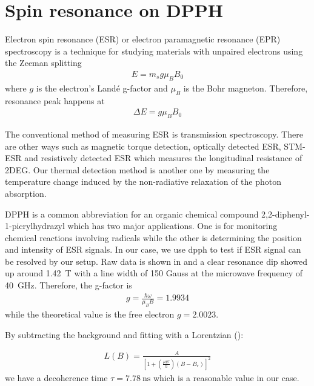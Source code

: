 \documentclass[12pt]{ruthesis}
\begin{document}
\section{Spin resonance on DPPH}\label{DPPH}

Electron spin resonance (ESR) or electron paramagnetic resonance (EPR) spectroscopy is a technique for studying materials with unpaired electrons using the Zeeman splitting 
\begin{align}
E=m_{s} g \mu_{B} B_{0}
\end{align}
where $g$ is the electron's Land\'{e} g-factor and $\mu_{B}$ is the Bohr magneton.
Therefore, resonance peak happens at 
\begin{align}
\Delta E=g \mu_{B} B_{0}
\end{align}

The conventional method of measuring ESR is transmission spectroscopy.
There are other ways such as magnetic torque detection, optically detected ESR, STM-ESR and resistively detected ESR which measures the longitudinal resistance of 2DEG. Our thermal detection method is another one by measuring the temperature change induced by the non-radiative relaxation of the photon absorption.

DPPH is a common abbreviation for an organic chemical compound 2,2-diphenyl-1-picrylhydrazyl which has two major applications. One is for monitoring chemical reactions involving radicals while the other is determining the position and intensity of ESR signals. 
In our case, we use dpph to test if ESR signal can be resolved by our setup. 
Raw data is shown in  and a clear resonance dip showed up around \SI{1.42}{\tesla} with a line width of 150 Gauss at the microwave frequency of \SI{40}{\giga \hertz}.
Therefore, the g-factor is
\begin{align}
g=\frac{\hbar \omega}{\mu_{B}B}=1.9934
\end{align}
while the theoretical value is the free electron $g=2.0023$.

By subtracting the background and fitting with a Lorentzian (): 

\begin{align}
L(B)=\frac{A}{[1+ (\frac{\mu g \tau}{h})(B-B_{r})]^{2}}
\end{align}  
we have a decoherence time $\tau = \SI{7.78}{\nano\second}$ which is a reasonable value in our case.
\end{document}

